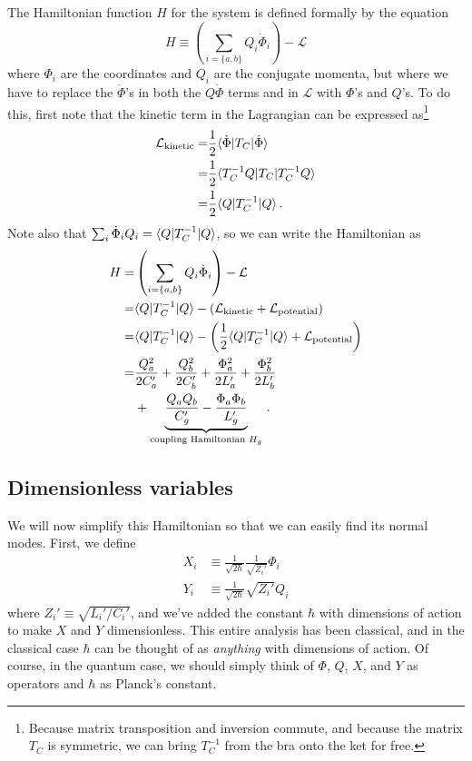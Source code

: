 \documentclass{article}
\begin{document}
The Hamiltonian function $H$ for the system is defined formally by the equation
\begin{equation*}
  H \equiv \left( \sum_{i = \{a, b\}} Q_i \dot \Phi_i \right) - \mathcal{L}
\end{equation*}
where $\Phi_i$ are the coordinates and $Q_i$ are the conjugate momenta, but where we have to replace the $\dot \Phi$'s in both the $Q \dot \Phi$ terms and in $\mathcal{L}$ with $\Phi$'s and $Q$'s.
To do this, first note that the kinetic term in the Lagrangian can be expressed as\footnote{Because matrix transposition and inversion commute, and because the matrix $T_C$ is symmetric, we can bring $T_C^{-1}$ from the bra onto the ket for free.}
\begin{align*}
  \mathcal{L}_\text{kinetic}
  =& \frac{1}{2} \langle \dot \Phi | T_C | \dot \Phi \rangle \\
  =& \frac{1}{2} \langle T_C^{-1} Q | T_C | T_C^{-1} Q \rangle \\
  =& \frac{1}{2} \langle Q | T_C^{-1} | Q \rangle
  \, .
\end{align*}
Note also that $\sum_i \dot \Phi_i Q_i = \langle Q | T_C^{-1} | Q \rangle$, so we can write the Hamiltonian as
\begin{align}
  H
  =& \left( \sum_{i = \{a, b\}} Q_i \dot \Phi_i \right) - \mathcal{L} \nonumber \\
  =& \langle Q | T_C^{-1} | Q \rangle - \left( \mathcal{L}_\text{kinetic} + \mathcal{L}_\text{potential} \right) \nonumber \\
  =& \langle Q | T_C^{-1} | Q \rangle - \left( \frac{1}{2} \langle Q | T_C^{-1} | Q \rangle + \mathcal{L}_\text{potential} \right) \nonumber \\
  =& \frac{Q_a^2}{2 C_a'} + \frac{Q_b^2}{2 C_b'} + \frac{\Phi_a^2}{2 L_a'} + \frac{\Phi_b^2}{2 L_b'} \nonumber \\
  &+ \underbrace{\frac{Q_a Q_b}{C_g'} - \frac{\Phi_a \Phi_b}{L_g'}}_{\text{coupling Hamiltonian }H_g}
  \, .
\end{align}

\subsection{Dimensionless variables}

We will now simplify this Hamiltonian so that we can easily find its normal modes.
First, we define
\begin{align*}
  X_i &\equiv \frac{1}{\sqrt{2 \hbar}} \frac{1}{\sqrt{Z_i'}} \Phi_i \\
  Y_i &\equiv \frac{1}{\sqrt{2 \hbar}} \sqrt{Z_i'} Q_i
\end{align*}
where $Z_i' \equiv \sqrt{L_i' / C_i'}$, and we've added the constant $\hbar$ with dimensions of action to make $X$ and $Y$ dimensionless.
This entire analysis has been classical, and in the classical case $\hbar$ can be thought of as \emph{anything} with dimensions of action.
Of course, in the quantum case, we should simply think of $\Phi$, $Q$, $X$, and $Y$ as operators and $\hbar$ as Planck's constant.
\end{document}
